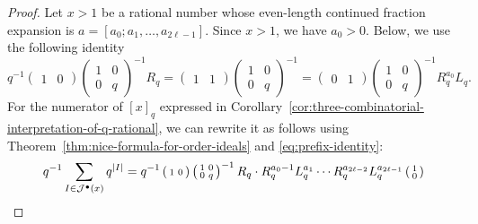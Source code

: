 \documentclass[a4paper,12pt]{amsart}
\newcommand{\xx}{{x}}
\newcommand{\Jcal}{{\mathcal{J}}}
\newcommand{\0}{\mathtt{0}}
\newcommand{\1}{\mathtt{1}}
\newcommand{\2}{\mathtt{2}}
\newcommand{\3}{\mathtt{3}}
\newcommand{\size}[1]{
    {|#1|}                 %
}
\begin{document}
\begin{proof}
    Let $\xx>1$ be a rational number
    whose even-length continued fraction expansion
    is $a=[a_0;a_1,\dots,a_{2\ell-1}]$.
    Since $\xx>1$, we have $a_0>0$.
    Below, we use the following identity
    \begin{equation}\label{eq:prefix-identity}
        q^{-1}
        \left(\begin{smallmatrix} 1 & 0 \end{smallmatrix}\right)
        \left(\begin{smallmatrix} 1 & 0 \\ 0 & q \end{smallmatrix}\right)^{-1}
            R_q
            = \left(\begin{smallmatrix} 1 & 1 \end{smallmatrix}\right)
              \left(\begin{smallmatrix} 1 & 0 \\ 0 & q \end{smallmatrix}\right)^{-1}
            =
        \left(\begin{smallmatrix} 0 & 1 \end{smallmatrix}\right)
        \left(\begin{smallmatrix} 1 & 0 \\ 0 & q \end{smallmatrix}\right)^{-1}
        R_q^{a_0}L_q.
    \end{equation}
    For the numerator of $[\xx]_q$
    expressed in Corollary~\ref{cor:three-combinatorial-interpretation-of-q-rational},
    we can rewrite it as follows
    using Theorem~\ref{thm:nice-formula-for-order-ideals} and \eqref{eq:prefix-identity}:
    \begingroup
    \allowdisplaybreaks
    \begin{align*}
        q^{-1}\sum_{I\in \Jcal^\bullet(\xx)} q^{\size{I}}
        &=
        q^{-1}
        \left(\begin{smallmatrix} 1 & 0 \end{smallmatrix}\right)
        \left(\begin{smallmatrix} 1 & 0 \\ 0 & q \end{smallmatrix}\right)^{-1}
            R_q\cdot
        R_q^{a_0-1}L_q^{a_1}\cdots R_q^{a_{2\ell-2}}L_q^{a_{2\ell-1}}
        \left(\begin{smallmatrix} 1 \\ 0 \end{smallmatrix}\right)\\

\end{align*}
\end{proof}
\end{document}
